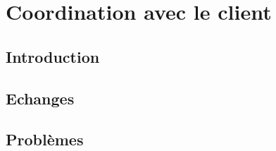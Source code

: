 
\chapter[Le client]{Coordination avec le client}
    \section{Introduction}
    \blindtext

    \section{Echanges}
    \blindtext

    \section{Problèmes}
    \blindtext


    